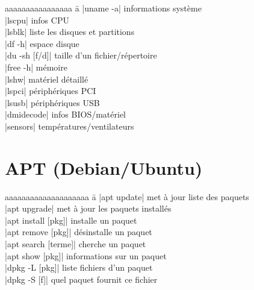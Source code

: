 \documentclass{article}
\begin{document}
\begin{multicols}{4}
    \begin{tabbing}
        aaaaaaaaaaaaaaaa \= a \kill
        \code|uname -a| \> informations système \\
        \code|lscpu| \> infos CPU \\
        \code|lsblk| \> liste les disques et partitions \\
        \code|df -h| \> espace disque \\
        \code|du -sh [f/d]| \> taille d'un fichier/répertoire \\
        \code|free -h| \> mémoire \\
        \code|lshw| \> matériel détaillé \\
        \code|lspci| \> périphériques PCI \\
        \code|lsusb| \> périphériques USB \\
        \code|dmidecode| \> infos BIOS/matériel \\
        \code|sensors| \> températures/ventilateurs
    \end{tabbing}

    \section*{APT (Debian/Ubuntu)}
    \begin{tabbing}
        aaaaaaaaaaaaaaaaaaaa \= a \kill
        \code|apt update| \> met à jour liste des paquets \\
        \code|apt upgrade| \> met à jour les paquets installés \\
        \code|apt install [pkg]| \> installe un paquet \\
        \code|apt remove [pkg]| \> désinstalle un paquet \\
        \code|apt search [terme]| \> cherche un paquet \\
        \code|apt show [pkg]| \> informations sur un paquet \\
        \code|dpkg -L [pkg]| \> liste fichiers d'un paquet \\
        \code|dpkg -S [f]| \> quel paquet fournit ce fichier
    \end{tabbing}




\end{multicols}
\end{document}
